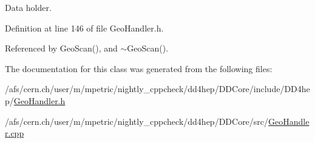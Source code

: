 Data holder. 

Definition at line 146 of file GeoHandler.h.

Referenced by GeoScan(), and $\sim$GeoScan().

The documentation for this class was generated from the following files:\begin{DoxyCompactItemize}
\item 
/afs/cern.ch/user/m/mpetric/nightly\_\-cppcheck/dd4hep/DDCore/include/DD4hep/\hyperlink{_geo_handler_8h}{GeoHandler.h}\item 
/afs/cern.ch/user/m/mpetric/nightly\_\-cppcheck/dd4hep/DDCore/src/\hyperlink{_geo_handler_8cpp}{GeoHandler.cpp}\end{DoxyCompactItemize}
